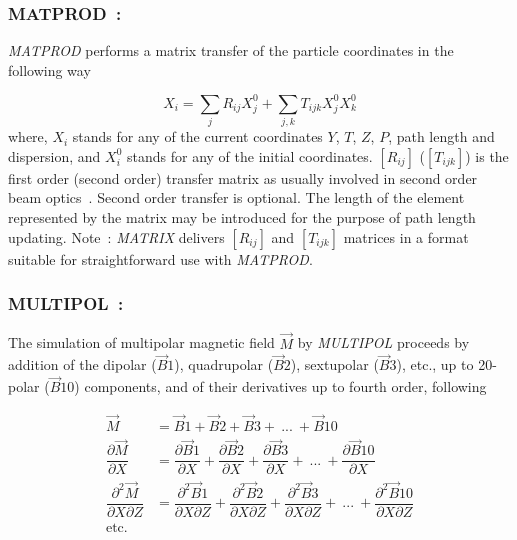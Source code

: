 \newpage

\subsubsection*{MATPROD~:  \MATPRODTitl}\label{MATPROD}
\medskip

\textsl{MATPROD} performs a matrix transfer of the particle coordinates 
in the following way 

$$ X_i = \sum_j R_{ij}X^0_j + \sum_{j,k} T_{ijk}X^0_jX^0_k $$
%
 where, $ X_i $ stands for any of the current coordinates $ Y$, $T$, $Z$, $P $, path length and dispersion, and $ X^0_i $ stands for any of the initial coordinates.
$[R_{ij}]$ ($[T_{ijk}]$) is the first order (second order) 
transfer matrix as usually involved in second order beam optics~\cite{Biblio10}.      %
Second order transfer is optional.  The length of the element represented by 
the matrix may be introduced for the purpose of path length updating.  
\medskip
Note~: \textsl{MATRIX} delivers $[R_{ij}]$ and $[T_{ijk}]$ matrices in a format 
suitable for straightforward use with \textsl{MATPROD}.

\newpage

\subsubsection*{MULTIPOL~:  \MULTIPOLTitl} \label{MULTIPOL}

The simulation of  multipolar magnetic field $ \vec  M $ by \textsl{MULTIPOL}  proceeds 
by addition of the dipolar  ($\vec  B1$),  quadrupolar ($ \vec  B2 $), sextupolar 
($ \vec  B3 $), etc., up to 20-polar  ($\vec  B10$) 
components, and of their derivatives up to fourth order, following

\begin{align*}
	\vec  M &   =   \vec B1+\vec  B2+\vec  B3+ \ ...\ +\vec  B10  \\ 
	\dfrac{ \partial\vec M }{ \partial X} 
	        &   = \dfrac{ \partial\vec  B1}{ \partial X} + 
	        \dfrac{\partial\vec  B2 }{ \partial X} + 
	        \dfrac{\partial\vec  B3}{ \partial X} + 
                            \ ...\ +
	        \dfrac{\partial\vec  B10 }{ \partial X} \\
	\dfrac{ \partial^ 2\vec  M }{ \partial X\partial Z} 
	       & = \dfrac{ \partial^ 2\vec  B1 }{ \partial X\partial Z} + 
	       \dfrac{\partial^ 2\vec  B2 }{ \partial X\partial Z} + 
	       \dfrac{\partial^ 2\vec  B3}{ \partial X\partial Z} + 
                            \ ...\ +
 	       \dfrac{\partial^ 2\vec  B10}{ \partial X\partial Z} \\
	\text{etc. } &
\end{align*}


